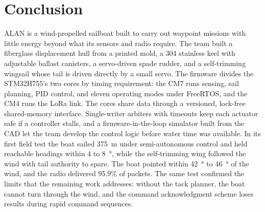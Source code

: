 \section{Conclusion}
\label{sec:conclusion}

ALAN is a wind-propelled sailboat built to carry out waypoint missions with
little energy beyond what its sensors and radio require. The team built a
fiberglass displacement hull from a printed mold, a 304 stainless keel with
adjustable ballast canisters, a servo-driven spade rudder, and a
self-trimming wingsail whose tail is driven directly by a small servo. The
firmware divides the STM32H755's two cores by timing requirement: the CM7 runs
sensing, sail planning, PID control, and eleven operating modes under
FreeRTOS, and the CM4 runs the LoRa link. The cores share data through a
versioned, lock-free shared-memory interface. Single-writer arbiters with
timeouts keep each actuator safe if a controller stalls, and a
firmware-in-the-loop simulator built from the CAD let the team develop the
control logic before water time was available. In its first field test the
boat sailed \SI{375}{\meter} under semi-autonomous control and held
reachable headings within 4 to \SI{8}{\degree}, while the self-trimming wing
followed the wind with tail authority to spare. The boat pointed within
\SI{42}{\degree} to \SI{46}{\degree} of the wind, and the radio delivered
95.9\% of packets. The same test confirmed the limits that the remaining
work addresses: without the tack planner, the boat cannot turn through the
wind, and the command acknowledgment scheme loses results during rapid
command sequences.
